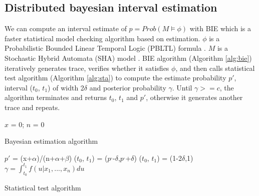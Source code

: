 \subsection{Distributed bayesian interval estimation}
We can compute an interval estimate of $p=Prob(M\models\phi)$ with BIE which is a faster statistical model checking algorithm based on estimation. $\phi$ is a Probabilistic Bounded Linear Temporal Logic (PBLTL) formula \cite{baier2008principles}. $M$ is a Stochastic Hybrid Automata (SHA) model \cite{David2014Statistical}. BIE algorithm (Algorithm \ref{alg:bie}) iteratively generates trace, verifies whether it satisfies $\phi$, and then calls statistical test algorithm (Algorithm \ref{alg:sta}) to compute the estimate probability $p'$, interval ($t_0$, $t_1$) of width 2$\delta$ and posterior probability $\gamma$. Until $\gamma >= c$, the algorithm terminates and returns $t_0$, $t_1$ and $p'$, otherwise it generates another trace and repeats.
\begin{algorithm}[t]
{}
$x$ = 0; $n$ = 0\;
\caption{Bayesian estimation algorithm}
\label{alg:bie}
\end{algorithm}
\begin{algorithm}[t]
{}
        $p'$ = (x+$\alpha$)/(n+$\alpha$+$\beta$)\;
        ($t_0$, $t_1$) = ($p^,$-$\delta$,$p^,$+$\delta$)\;
        {
           ($t_0$, $t_1$) = (1-2$\delta$,1)\;
         }{
          }
        $\gamma=\int_{t_0}^{t_1} {f(u|x_1,...,x_n)du}$\;
\caption{Statistical test algorithm}
\label{alg:sta}
\end{algorithm}

